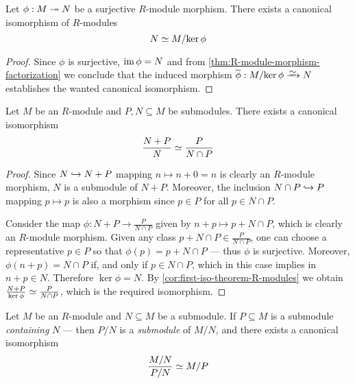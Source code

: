 \begin{corollary}
\label{cor:first-iso-theorem-R-modules}
Let \(\phi: M \twoheadrightarrow N\) be a surjective \(R\)-module morphism. There exists a
canonical isomorphism of \(R\)-modules
\[
N \simeq M/{\ker \phi}
\]
\end{corollary}

\begin{proof}
Since \(\phi\) is surjective, \(\operatorname{im} \phi = N\) and from
\cref{thm:R-module-morphism-factorization} we conclude that the induced morphism
\(\overline{\phi}: M/{\ker \phi} \isoto N\) establishes the wanted canonical
isomorphism.
\end{proof}

\begin{proposition}
\label{prop:second-iso-R-mod}
Let \(M\) be an \(R\)-module and \(P, N \subseteq M\) be submodules. There
exists a canonical isomorphism
\[
\frac{N + P}{N} \simeq \frac{P}{N \cap P}
\]
\end{proposition}

\begin{proof}
Since \(N \hookrightarrow N + P\) mapping \(n \mapsto n + 0 = n\) is clearly an
\(R\)-module morphism, \(N\) is a submodule of \(N + P\). Moreover, the
inclusion \(N \cap P \hookrightarrow P\) mapping \(p \mapsto p\) is also a morphism since
\(p \in P\) for all \(p \in N \cap P\).

Consider the map \(\phi: N + P \to \frac{P}{N \cap P}\) given by
\(n + p \mapsto p + N \cap P\), which is clearly an \(R\)-module morphism. Given
any class \(p + N \cap P \in \frac{P}{N \cap P}\), one can choose a
representative \(p \in P\) so that \(\phi(p) = p + N \cap P\) --- thus \(\phi\)
is surjective. Moreover, \(\phi(n + p) = N \cap P\) if, and only if
\(p \in N \cap P\), which in this case implies in \(n + p \in N\). Therefore
\(\ker \phi = N\). By \cref{cor:first-iso-theorem-R-modules} we obtain
\(\frac{N + P}{\ker \phi} \simeq \frac{P}{N \cap P}\), which is the required
isomorphism.
\end{proof}

\begin{proposition}
\label{prop:third-iso-R-mod}
Let \(M\) be an \(R\)-module and \(N \subseteq M\) be a submodule. If
\(P \subseteq M\) is a submodule \emph{containing} \(N\) --- then \(P/N\) is a
\emph{submodule} of \(M/N\), and there exists a canonical isomorphism
\[
\frac{M/N}{P/N} \simeq M/P
\]
\end{proposition}

